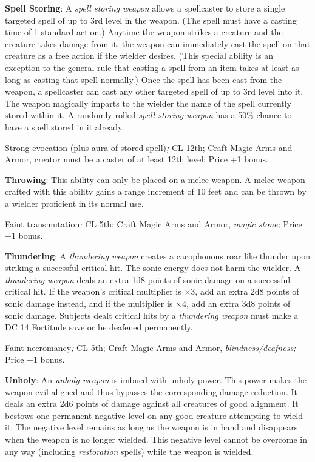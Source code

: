 \textbf{Spell Storing}: A \textit{spell storing weapon} allows a spellcaster to store a single targeted spell of up to 3rd level in the weapon. (The spell must have a casting time of 1 standard action.) Anytime the weapon strikes a creature and the creature takes damage from it, the weapon can immediately cast the spell on that creature as a free action if the wielder desires. (This special ability is an exception to the general rule that casting a spell from an item takes at least as long as casting that spell normally.) Once the spell has been cast from the weapon, a spellcaster can cast any other targeted spell of up to 3rd level into it. The weapon magically imparts to the wielder the name of the spell currently stored within it. A randomly rolled \textit{spell storing weapon} has a 50\% chance to have a spell stored in it already.
				
Strong evocation (plus aura of stored spell)\textit{; }CL 12th; Craft Magic Arms and Armor, creator must be a caster of at least 12th level; Price +1 bonus.
				
\textbf{Throwing}: This ability can only be placed on a melee weapon. A melee weapon crafted with this ability gains a range increment of 10 feet and can be thrown by a wielder proficient in its normal use.
				
Faint transmutation\textit{; }CL 5th; Craft Magic Arms and Armor, \textit{magic stone; }Price +1 bonus.
				
\textbf{Thundering}: A \textit{thundering weapon} creates a cacophonous roar like thunder upon striking a successful critical hit. The sonic energy does not harm the wielder. A \textit{thundering weapon} deals an extra 1d8 points of sonic damage on a successful critical hit. If the weapon's critical multiplier is \mbox{$\times$}3, add an extra 2d8 points of sonic damage instead, and if the multiplier is \mbox{$\times$}4, add an extra 3d8 points of sonic damage. Subjects dealt critical hits by a \textit{thundering weapon} must make a DC 14 Fortitude save or be deafened permanently.
				
Faint necromancy\textit{; }CL 5th; Craft Magic Arms and Armor, \textit{blindness/deafness; }Price +1 bonus.
				
\textbf{Unholy}: An \textit{unholy weapon} is imbued with unholy power. This power makes the weapon evil-aligned and thus bypasses the corresponding damage reduction. It deals an extra 2d6 points of damage against all creatures of good alignment. It bestows one permanent negative level on any good creature attempting to wield it. The negative level remains as long as the weapon is in hand and disappears when the weapon is no longer wielded. This negative level cannot be overcome in any way (including \textit{restoration }spells) while the weapon is wielded.
				
